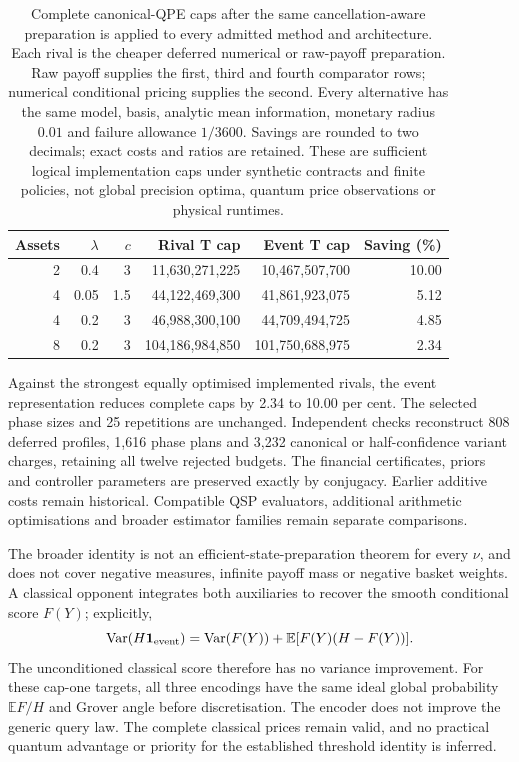 \documentclass[11pt]{article}
\newcommand{\E}{\mathbb E}
\begin{document}
\begin{table}[ht]
\centering\small
\begin{tabular}{rrrrrr}
\toprule
Assets&$\lambda$&$c$&Rival T cap&Event T cap&Saving (\%)\\
\midrule
2&0.4&3&11,630,271,225&10,467,507,700&10.00\\
4&0.05&1.5&44,122,469,300&41,861,923,075&5.12\\
4&0.2&3&46,988,300,100&44,709,494,725&4.85\\
8&0.2&3&104,186,984,850&101,750,688,975&2.34\\
\bottomrule
\end{tabular}
\caption{Complete canonical-QPE caps after the same cancellation-aware preparation is applied to every admitted method and architecture. Each rival is the cheaper deferred numerical or raw-payoff preparation. Raw payoff supplies the first, third and fourth comparator rows; numerical conditional pricing supplies the second. Every alternative has the same model, basis, analytic mean information, monetary radius $0.01$ and failure allowance $1/3600$. Savings are rounded to two decimals; exact costs and ratios are retained. These are sufficient logical implementation caps under synthetic contracts and finite policies, not global precision optima, quantum price observations or physical runtimes.}
\label{tab:shared-threshold}
\end{table}

Against the strongest equally optimised implemented rivals, the event
representation reduces complete caps by 2.34 to 10.00 per cent. The
selected phase sizes and 25 repetitions are unchanged. Independent checks
reconstruct 808 deferred profiles, 1,616 phase plans and 3,232 canonical
or half-confidence variant charges, retaining all twelve rejected budgets.
The financial certificates, priors and controller parameters are preserved
exactly by conjugacy. Earlier additive costs remain historical.
Compatible QSP evaluators, additional arithmetic optimisations and broader
estimator families remain separate comparisons.

The broader identity is not an efficient-state-preparation theorem for
every $\nu$, and does not cover negative measures, infinite payoff mass
or negative basket weights. A classical opponent integrates both
auxiliaries to recover the smooth conditional score $F(Y)$; explicitly,
\begin{equation}
\operatorname{Var}(H\mathbf1_{\rm event})
=\operatorname{Var}(F(Y))+\E[F(Y)(H-F(Y))].
\end{equation}
The unconditioned classical score therefore has no variance improvement.
For these cap-one targets, all three encodings have the same ideal
global probability $\E F/H$ and Grover angle before discretisation.
The encoder does not improve the generic query law. The complete classical prices remain valid, and no practical quantum
advantage or priority for the established threshold identity is inferred.
\end{document}
